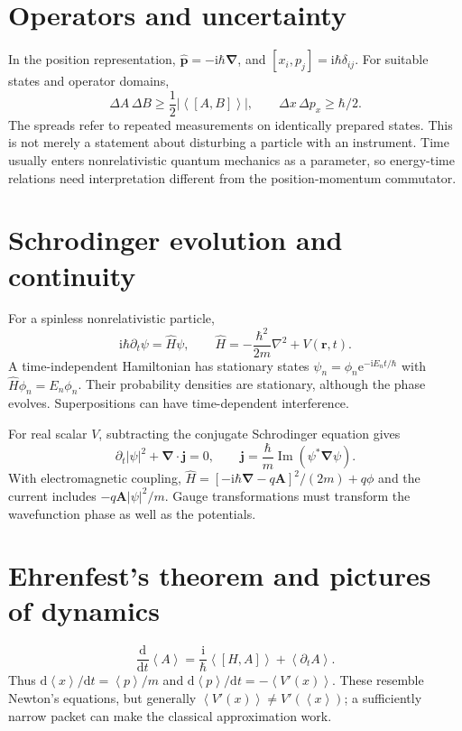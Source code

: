 \documentclass[11pt,oneside]{book}
\newcommand{\dd}{\mathrm{d}}
\newcommand{\ii}{\mathrm{i}}
\newcommand{\ee}{\mathrm{e}}
\newcommand{\vect}[1]{\boldsymbol{#1}}
\newcommand{\grad}{\boldsymbol{\nabla}}
\newcommand{\lap}{\nabla^2}
\newcommand{\avg}[1]{\left\langle #1\right\rangle}
\newcommand{\od}[2]{\frac{\dd #1}{\dd #2}}
\theoremstyle{reviewstyle}
\begin{document}
\section{Operators and uncertainty}
In the position representation, $\hat{\vect p}=-\ii\hbar\grad$, and $[x_i,p_j]=\ii\hbar\delta_{ij}$. For suitable states and operator domains,
\begin{equation}\Delta A\,\Delta B\geq\frac12|\avg{[A,B]}|,\qquad \Delta x\,\Delta p_x\geq\hbar/2.\end{equation}
The spreads refer to repeated measurements on identically prepared states. This is not merely a statement about disturbing a particle with an instrument. Time usually enters nonrelativistic quantum mechanics as a parameter, so energy-time relations need interpretation different from the position-momentum commutator.
\section{Schrodinger evolution and continuity}
For a spinless nonrelativistic particle,
\begin{equation}\ii\hbar\partial_t\psi=\hat H\psi,\qquad \hat H=-\frac{\hbar^2}{2m}\lap+V(\vect r,t).\end{equation}
A time-independent Hamiltonian has stationary states $\psi_n=\phi_n\ee^{-\ii E_nt/\hbar}$ with $\hat H\phi_n=E_n\phi_n$. Their probability densities are stationary, although the phase evolves. Superpositions can have time-dependent interference.

For real scalar $V$, subtracting the conjugate Schrodinger equation gives
\begin{equation}\partial_t|\psi|^2+\grad\cdot\vect j=0,\qquad \vect j=\frac\hbar m\operatorname{Im}(\psi^*\grad\psi).\end{equation}
With electromagnetic coupling, $\hat H=[-\ii\hbar\grad-q\vect A]^2/(2m)+q\phi$ and the current includes $-q\vect A|\psi|^2/m$. Gauge transformations must transform the wavefunction phase as well as the potentials.
\section{Ehrenfest's theorem and pictures of dynamics}
\begin{equation}\od{}{t}\avg A=\frac{\ii}{\hbar}\avg{[H,A]}+\avg{\partial_t A}.\end{equation}
Thus $\dd\avg x/\dd t=\avg p/m$ and $\dd\avg p/\dd t=-\avg{V'(x)}$. These resemble Newton's equations, but generally $\avg{V'(x)}\neq V'(\avg x)$; a sufficiently narrow packet can make the classical approximation work.
\end{document}
